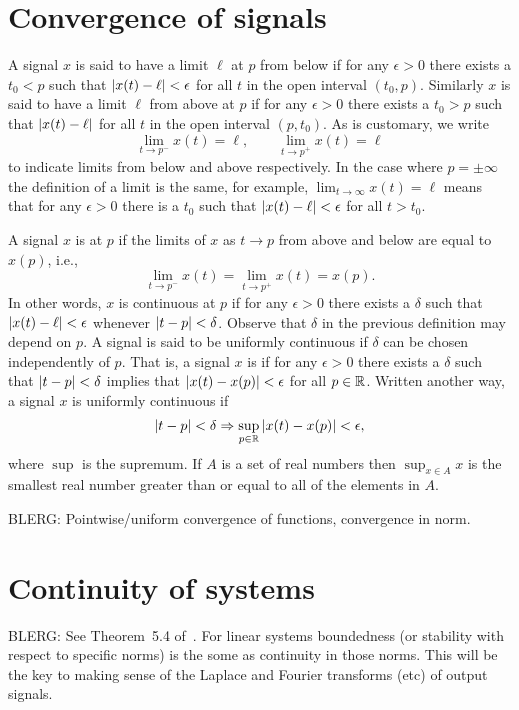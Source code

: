 \begin{advanced}

\section{Convergence of signals}

A signal $x$ is said to have a limit $\ell$ at $p$ from below if for any $\epsilon > 0$ there exists a $t_0 <  p$ such that $\left\vert x(t) - \ell \right\vert < \epsilon$ for all $t$ in the open interval $(t_0, p)$.  Similarly $x$ is said to have a limit $\ell$ from above at $p$ if for any $\epsilon > 0$ there exists a $t_0 > p$ such that $\left\vert x(t) - \ell \right\vert$ for all $t$ in the open interval $(p, t_0)$.  As is customary, we write
\[
\lim_{t \to p^-} x(t) = \ell, \qquad \lim_{t \to p^+} x(t) = \ell
\]
to indicate limits from below and above respectively.  In the case where $p = \pm \infty$ the definition of a limit is the same, for example, $\lim_{t \rightarrow \infty} x(t) = \ell$ means that for any $\epsilon > 0$ there is a $t_0$ such that $\left\vert x(t) - \ell \right\vert < \epsilon$ for all $t > t_0$.

A signal $x$ is  at $p$ if the limits of $x$ as $t \rightarrow p$ from above and below are equal to $x(p)$, i.e.,
\[
\lim_{t \to p^-} x(t) = \lim_{t \to p^+} x(t) = x(p).
\]
In other words, $x$ is continuous at $p$ if for any $\epsilon > 0$ there exists a $\delta$ such that $\left\vert x(t) - \ell \right\vert < \epsilon$ whenever $\left\vert t - p \right\vert < \delta$.  Observe that $\delta$ in the previous definition may depend on $p$.  A signal is said to be uniformly continuous if $\delta$ can be chosen independently of $p$.  That is, a signal $x$ is  if for any $\epsilon > 0$ there exists a $\delta$ such that $\left\vert t - p \right\vert < \delta$ implies that $\left\vert x(t) - x(p) \right\vert < \epsilon$ for all $p \in {\mathbb R}$.  Written another way, a signal $x$ is uniformly continuous if
\[
\left\vert t - p \right\vert < \delta \Rightarrow \sup_{p \in {\mathbb R}} \left\vert x(t) - x(p) \right\vert < \epsilon,
\]
where $\sup$ is the supremum.  If $A$ is a set of real numbers then $\sup_{x \in A} x$ is the smallest real number greater than or equal to all of the elements in $A$. 

BLERG: Pointwise/uniform convergence of functions, convergence in norm.


\section{Continuity of systems}

BLERG: See Theorem~5.4 of~\cite{Rudin_real_and_complex_analysis}.  For linear systems boundedness (or stability with respect to specific norms) is the some as continuity in those norms.  This will be the key to making sense of the Laplace and Fourier transforms (etc) of output signals.

\end{advanced}

